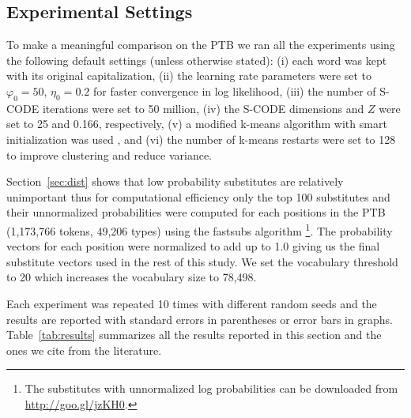 \subsection{Experimental Settings}\label{sec:expset}

To make a meaningful comparison on the PTB we ran all the experiments
using the following default settings (unless otherwise stated): (i)
each word was kept with its original capitalization, (ii) the learning
rate parameters were set to $\varphi_0=50$, $\eta_0=0.2$ for faster
convergence in log likelihood, (iii) the number of S-CODE iterations
were set to 50 million, (iv) the S-CODE dimensions and $Z$ were set to
25 and 0.166, respectively, (v) a modified k-means algorithm with
smart initialization was used \cite{arthur2007k}, and (vi) the number
of k-means restarts were set to 128 to improve clustering and reduce
variance.

Section~\ref{sec:dist} shows that low probability substitutes are
relatively unimportant thus for computational efficiency only the top
100 substitutes and their unnormalized probabilities were computed for
each positions in the PTB (1,173,766 tokens, 49,206 types) using the
{\sc fastsubs} algorithm \cite{yuret2021fastsub}\footnote{The
  substitutes with unnormalized log probabilities can be downloaded
  from \mbox{\url{http://goo.gl/jzKH0}}.}.  The probability vectors
for each position were normalized to add up to 1.0 giving us the final
substitute vectors used in the rest of this study.  We set the
vocabulary threshold to 20 which increases the vocabulary size to
78,498.



Each experiment was repeated 10 times with different random seeds and
the results are reported with standard errors in parentheses or error
bars in graphs.  Table~\ref{tab:results} summarizes all the results
reported in this section and the ones we cite from the literature.

